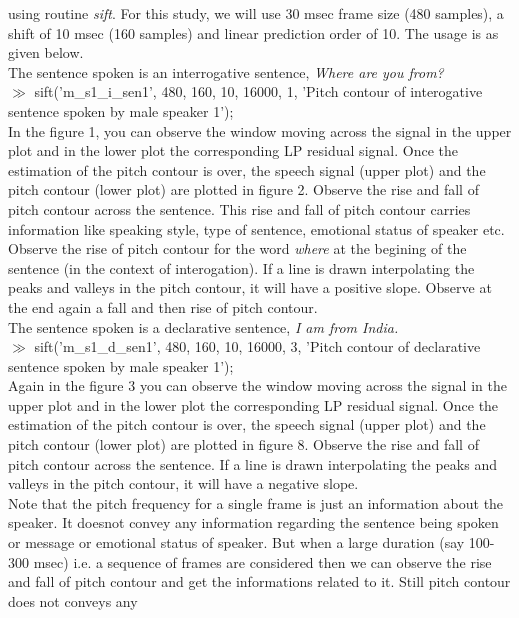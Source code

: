 using routine {\it sift}. For this study, we will use 30 msec
frame size (480 samples), a shift of 10 msec (160 samples) and
linear prediction order of 10. The usage is as given below.\\[1ex] 
The sentence spoken is an interrogative sentence, {\it Where are you
from?}\\[1ex]
$\gg$ sift('m\_s1\_i\_sen1', 480, 160, 10, 16000, 1, 'Pitch contour
of interogative sentence spoken by male speaker 1');\\[1ex]
\noindent
In the figure 1, you can observe the window moving across the signal
in the upper plot and in the lower plot the corresponding LP residual
signal. Once the estimation of the pitch contour is over, the speech
signal (upper plot) and the pitch contour (lower plot) are plotted in
figure 2. Observe the rise and fall of pitch contour across the
sentence. This rise and fall of pitch contour carries information like
speaking style, type of sentence, emotional status of speaker
etc. Observe the rise of pitch contour for the word {\it where} at the
begining of the sentence (in the
context of interogation). If a line is drawn interpolating 
the peaks and valleys in the pitch contour, it
will have a positive slope. Observe at the end 
again a fall and then rise of pitch contour.\\[1ex]
\noindent
The sentence spoken is a declarative sentence, {\it I am from
India.}\\[1ex]
$\gg$ sift('m\_s1\_d\_sen1', 480, 160, 10, 16000, 3, 'Pitch contour
of declarative sentence spoken by male speaker 1');\\[1ex]
\noindent
Again in the figure 3 you can observe the window moving across the signal
in the upper plot and in the lower plot the corresponding LP residual
signal. Once the estimation of the pitch contour is over, the speech
signal (upper plot) and the pitch contour (lower plot) are plotted in
figure 8. Observe the rise and fall of pitch contour across the
sentence. If a line is drawn interpolating the peaks and valleys in
the pitch contour, it will have a negative slope.\\[1ex]
\noindent
Note that the pitch frequency for a single frame is just an
information about the speaker. It doesnot convey any information
regarding the sentence being spoken or message or emotional status of
speaker. But when a large duration (say 100-300 msec) i.e. a sequence
of frames are considered then we can observe the rise and fall of pitch
contour and get the
informations related to it. Still pitch contour does not conveys any
